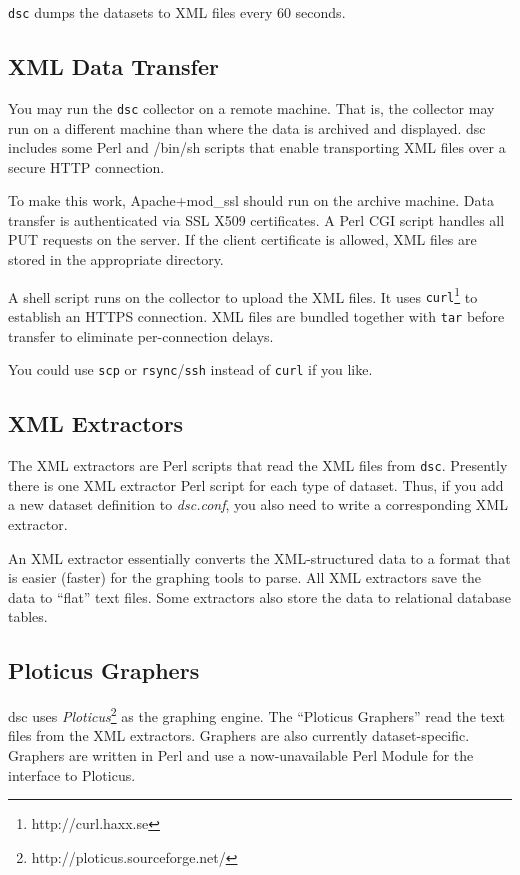\documentclass{report}
\def\dsc{{\sc dsc}}
\begin{document}
{\tt dsc\/} dumps the datasets to XML files every 60 seconds.

\subsection{XML Data Transfer}

You may run the {\tt dsc\/} collector on a remote machine.  That
is, the collector may run on a different machine than where the
data is archived and displayed.  {\dsc} includes some Perl and /bin/sh
scripts that enable transporting XML files over a secure HTTP
connection.

To make this work, Apache+mod\_ssl should run on the archive machine.
Data transfer is authenticated via SSL X509 certificates.  A Perl
CGI script handles all PUT requests on the server.  If the client
certificate is allowed, XML files are stored in the appropriate
directory.

A shell script runs on the collector to upload the XML files.  It
uses {\tt curl\/}\footnote{http://curl.haxx.se} to establish an
HTTPS connection.  XML files are bundled together with {\tt tar\/}
before transfer to eliminate per-connection delays.

You could use {\tt scp\/} or {\tt rsync\/}/{\tt ssh\/} instead of
{\tt curl\/} if you like.

\subsection{XML Extractors}

The XML extractors are Perl scripts that read the XML files from
{\tt dsc\/}.  Presently there is one XML extractor Perl script for
each type of dataset.  Thus, if you add a new dataset definition
to {\em dsc.conf\/}, you also need to write a corresponding XML
extractor.

An XML extractor essentially converts the XML-structured data to a
format that is easier (faster) for the graphing tools to parse.
All XML extractors save the data to ``flat'' text files.  Some
extractors also store the data to relational database tables.

\subsection{Ploticus Graphers}

{\dsc} uses {\em Ploticus\/}\footnote{http://ploticus.sourceforge.net/}
as the graphing engine.  The ``Ploticus Graphers'' read the text
files from the XML extractors.  Graphers are also currently
dataset-specific.   Graphers are written in Perl and use a
now-unavailable Perl Module for the interface to Ploticus.
\end{document}
